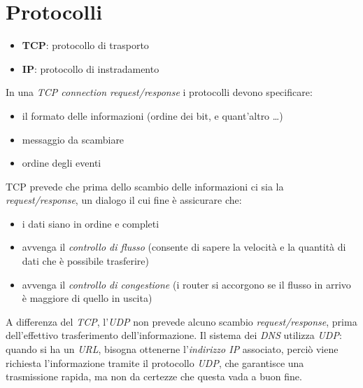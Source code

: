 \section{Protocolli}
\begin{itemize}
    \item \textbf{TCP}: protocollo di trasporto
    \item \textbf{IP}: protocollo di instradamento
\end{itemize}

In una \textit{TCP connection request/response} i protocolli devono specificare:
\begin{itemize}
    \item il formato delle informazioni (ordine dei bit, e quant'altro \ldots)
    \item messaggio da scambiare
    \item ordine degli eventi
\end{itemize}

TCP prevede che prima dello scambio delle informazioni ci sia la \textit{request/response}, un dialogo il cui fine è assicurare che:
\begin{itemize}
    \item i dati siano in ordine e completi
    \item avvenga il \textit{controllo di flusso} (consente di sapere la velocità e la quantità di dati che è possibile trasferire)
    \item avvenga il \textit{controllo di congestione} (i router si accorgono se il flusso in arrivo è maggiore di quello in uscita)
\end{itemize}

A differenza del \textit{TCP}, l'\textit{UDP} non prevede alcuno scambio \textit{request/response}, prima dell'effettivo trasferimento dell'informazione. Il sistema dei \textit{DNS} utilizza \textit{UDP}: quando si ha un \textit{URL}, bisogna ottenerne l'\textit{indirizzo IP} associato, perciò viene richiesta l'informazione tramite il protocollo \textit{UDP}, che garantisce una trasmissione rapida, ma non da certezze che questa vada a buon fine.

